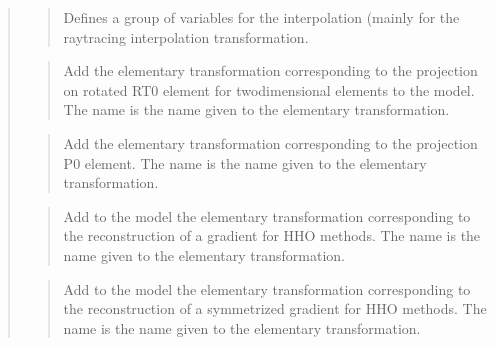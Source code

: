 \documentclass[a4paper,11pt,english]{sphinxmanual}
\begin{document}
\begin{quote}
\begin{quote}
\sphinxAtStartPar
Defines a group of variables for the interpolation (mainly for the
raytracing interpolation transformation.
\end{quote}

\sphinxAtStartPar
{}
\begin{quote}

\sphinxAtStartPar
Add the elementary transformation corresponding to the projection
on rotated RT0 element for two\sphinxhyphen{}dimensional elements to the model.
The name is the name given to the elementary transformation.
\end{quote}

\sphinxAtStartPar
{}
\begin{quote}

\sphinxAtStartPar
Add the elementary transformation corresponding to the projection
P0 element.
The name is the name given to the elementary transformation.
\end{quote}

\sphinxAtStartPar
{}
\begin{quote}

\sphinxAtStartPar
Add to the model the elementary transformation corresponding to the
reconstruction of a gradient for HHO methods.
The name is the name given to the elementary transformation.
\end{quote}

\sphinxAtStartPar
{}
\begin{quote}

\sphinxAtStartPar
Add to the model the elementary transformation corresponding to the
reconstruction of a symmetrized gradient for HHO methods.
The name is the name given to the elementary transformation.
\end{quote}

\sphinxAtStartPar
{}
\begin{quote}


\end{quote}
\end{quote}
\end{document}
